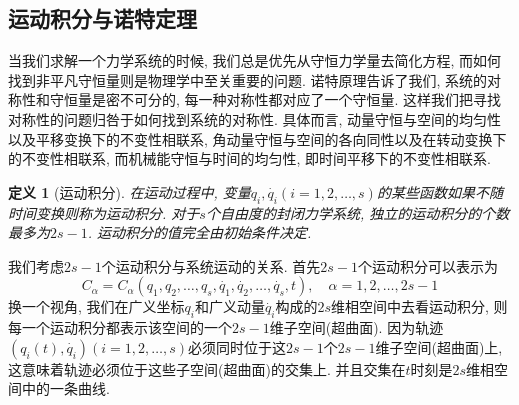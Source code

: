 \documentclass[a4paper,11pt]{book}
\newtheorem{definition}{\hspace{2em}定义}[section]
\begin{document}
\subsection{运动积分与诺特定理}
当我们求解一个力学系统的时候, 我们总是优先从守恒力学量去简化方程, 而如何找到非平凡守恒量则是物理学中至关重要的问题. 诺特原理告诉了我们, 系统的对称性和守恒量是密不可分的, 每一种对称性都对应了一个守恒量. 这样我们把寻找对称性的问题归咎于如何找到系统的对称性. 具体而言, 动量守恒与空间的均匀性以及平移变换下的不变性相联系, 角动量守恒与空间的各向同性以及在转动变换下的不变性相联系, 而机械能守恒与时间的均匀性, 即时间平移下的不变性相联系.
\begin{definition}[运动积分]
  在运动过程中, 变量$q_i,\dot{q_i}(i=1,2,\dots,s)$的某些函数如果不随时间变换则称为运动积分. 对于$s$个自由度的封闭力学系统, 独立的运动积分的个数最多为$2s-1$. 运动积分的值完全由初始条件决定.
\end{definition}
我们考虑$2s-1$个运动积分与系统运动的关系. 首先$2s-1$个运动积分可以表示为
\begin{equation*}
  C_\alpha=C_\alpha(q_1,q_2,\dots,q_s,\dot{q_1},\dot{q_2},\dots,\dot{q_s},t),\quad \alpha=1,2,\dots,2s-1
\end{equation*}
换一个视角, 我们在广义坐标$q_i$和广义动量$\dot{q_i}$构成的$2s$维相空间中去看运动积分, 则每一个运动积分都表示该空间的一个$2s-1$维子空间(超曲面). 因为轨迹$(q_i(t),\dot{q_i})(i=1,2,\dots,s)$必须同时位于这$2s-1$个$2s-1$维子空间(超曲面)上, 这意味着轨迹必须位于这些子空间(超曲面)的交集上. 并且交集在$t$时刻是$2s$维相空间中的一条曲线.
\end{document}
